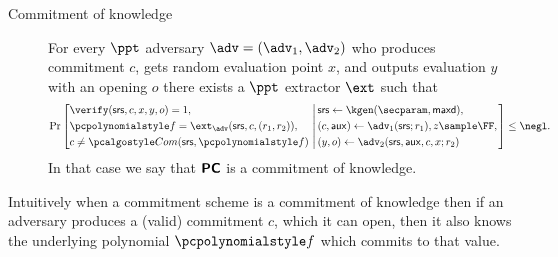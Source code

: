 \documentclass[runningheads,11pt]{llncs}
\begin{document}
\begin{description}
\item[Commitment of knowledge] For every $\ppt$ adversary
  $\adv = (\adv_1, \adv_2)$ who produces commitment $c$, gets random evaluation
  point $x$, and outputs evaluation $y$ with an opening $o$ there exists a
  $\ppt$ extractor $\ext$ such that
\[
  \Pr \left[
    \begin{aligned}
      & \verify(\srs, c, x, y, o) = 1, \\
      & \p{f} = \ext_\adv(\srs, c, (r_1, r_2)),\\
      & c \neq \com(\srs, \p{f}) \\
    \end{aligned}
    \,\left|\,
      \vphantom{
        \begin{aligned}
          & \\
          & \\
          &
        \end{aligned}
        }
    \begin{aligned}
      & \srs \gets \kgen(\secparam, \maxdeg),\\
      & (c, \aux) \gets \adv_1(\srs; r_1), z \sample \FF, \\
      &  (y, o) \gets \adv_2(\srs, \aux, c, x; r_2)
    \end{aligned}
  \right.\right]
  \leq \negl.
\]
In that case we say that $\bm{\mathsf{PC}}$ is a commitment of knowledge.
\end{description}
Intuitively when a commitment scheme is a commitment of knowledge then if an
adversary produces a (valid) commitment $c$, which it can open, then it also
knows the underlying polynomial $\p{f}$ which commits to that value.


\newcommand{\Kzg}{\mathsf{KZG}}

\def\cgen{{\sf ComGen}}
\def\commit{{\sf Com}}
\newcommand{\CM}{\commit}

\def\gk{{\sf gk}}

\def\ck{{\sf ck}}
\newcommand{\secp}{\lambda}
\end{document}
